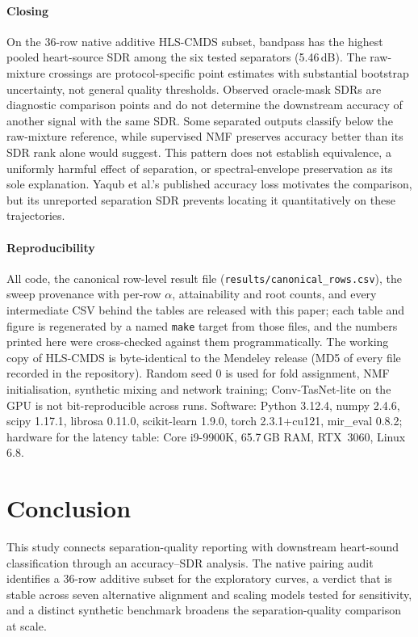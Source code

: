 \documentclass[journal]{IEEEtran}
\begin{document}
\paragraph{Closing}
On the 36-row native additive HLS-CMDS subset, bandpass has the highest pooled heart-source SDR among the six tested separators (5.46\,dB). The raw-mixture crossings are protocol-specific point estimates with substantial bootstrap uncertainty, not general quality thresholds. Observed oracle-mask SDRs are diagnostic comparison points and do not determine the downstream accuracy of another signal with the same SDR. Some separated outputs classify below the raw-mixture reference, while supervised NMF preserves accuracy better than its SDR rank alone would suggest. This pattern does not establish equivalence, a uniformly harmful effect of separation, or spectral-envelope preservation as its sole explanation. Yaqub et al.'s published accuracy loss motivates the comparison, but its unreported separation SDR prevents locating it quantitatively on these trajectories.

\paragraph{Reproducibility}
All code, the canonical row-level result file (\texttt{results/canonical\_rows.csv}), the sweep provenance with per-row $\alpha$, attainability and root counts, and every intermediate CSV behind the tables are released with this paper; each table and figure is regenerated by a named \texttt{make} target from those files, and the numbers printed here were cross-checked against them programmatically. The working copy of HLS-CMDS is byte-identical to the Mendeley release (MD5 of every file recorded in the repository). Random seed 0 is used for fold assignment, NMF initialisation, synthetic mixing and network training; Conv-TasNet-lite on the GPU is not bit-reproducible across runs. Software: Python 3.12.4, numpy 2.4.6, scipy 1.17.1, librosa 0.11.0, scikit-learn 1.9.0, torch 2.3.1+cu121, mir\_eval 0.8.2; hardware for the latency table: Core i9-9900K, 65.7\,GB RAM, RTX~3060, Linux 6.8.

\section{Conclusion}

This study connects separation-quality reporting with downstream heart-sound classification through an accuracy--SDR analysis. The native pairing audit identifies a 36-row additive subset for the exploratory curves, a verdict that is stable across seven alternative alignment and scaling models tested for sensitivity, and a distinct synthetic benchmark broadens the separation-quality comparison at scale.
\end{document}
